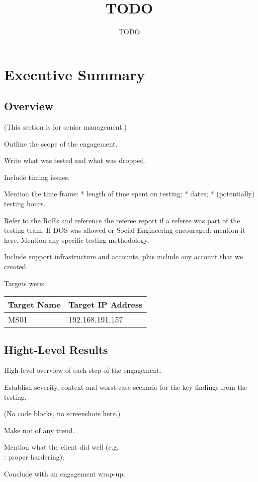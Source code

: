 \documentclass[a4paper, 12pt]{report}
\title{TODO}
\author{TODO}
\begin{document}
\maketitle

\tableofcontents

\chapter{Executive Summary}
\section{Overview}
(This section is for senior management.)

Outline the scope of the engagement.

Write what was tested and what was dropped.

Include timing issues.

Mention the time frame:
	* length of time spent on testing;
	* dates;
	* (potentially) testing hours.

Refer to the RoEs and reference the referee report if a referee was part of
the testing team.
If DOS was allowed or Social Engineering encouraged: mention it here.
Mention any specific testing methodology.

Include support infrastructure and accounts, plus include any account that we
created.

Targets were:

\begin{tabular}{ll}
	\toprule
	Target Name & Target IP Address \\
	\midrule
	 MS01 & 192.168.191.157\\
	\bottomrule
\end{tabular}

\section{Hight-Level Results}
High-level overview of each step of the engagement.

Establish severity, context and worst-case scenario for the key findings from
the testing.

(No code blocks, no screenshots here.)

Make not of any trend.

Mention what the client did well (e.g.\\: proper hardering).

Conclude with an engagement wrap-up.
\end{document}

